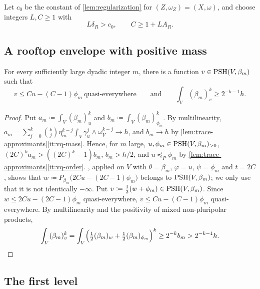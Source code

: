 \documentclass[11pt,a4paper]{amsart}
\newcommand{\lessP}{\preceq_{P}}
\theoremstyle{definition}
\begin{document}
Let $c_0$ be the constant of \cref{lem:regularization} for
$(Z,\omega_Z)=(X,\omega)$, and choose integers $L,C\ge1$ with
\begin{equation}\label{eq:constants}
  L\delta_R>c_0,\qquad C\ge 1+LA_R .
\end{equation}

\subsection{A rooftop envelope with positive mass}

\begin{lemma}\label{lem:positive-rooftop}
For every sufficiently large dyadic integer $m$, there is a function
$v\in\mathrm{PSH}(V,\beta_m)$ such that
\[
  v\le Cu-(C-1)\phi_m\ \text{quasi-everywhere}
  \qquad\text{and}\qquad
  \int_V(\beta_m)_{v}^k\ge2^{-k-1}h .
\]
\end{lemma}

\begin{proof}
Put $a_m\coloneqq \int_V(\beta_m)_u^k$ and
$b_m\coloneqq \int_V(\beta_m)_{\phi_m}^k$. By multilinearity,
$a_m=\sum_{j=0}^k\binom kj\eta_m^{k-j}\int_V\gamma_u^j\wedge\omega_V^{k-j}\to h$,
and $b_m\to h$ by \cref{lem:trace-approximants}\ref{it:vq-mass}. Hence,
for $m$ large, $u,\phi_m\in\mathrm{PSH}(V,\beta_m)_{>0}$,
$(2C)^ka_m>((2C)^k-1)b_m$, $b_m>h/2$, and $u\lessP\phi_m$ by
\cref{lem:trace-approximants}\ref{it:vq-order}. ,
applied on $V$ with $\theta=\beta_m$, $\varphi=u$, $\psi=\phi_m$ and
$t=2C$, shows that
$w\coloneqq P_{\beta_m}\bigl(2Cu-(2C-1)\phi_m\bigr)$ belongs to
$\mathrm{PSH}(V,\beta_m)$; we only use that it is not identically $-\infty$. Put
$v\coloneqq \tfrac12(w+\phi_m)\in\mathrm{PSH}(V,\beta_m)$. Since
$w\le 2Cu-(2C-1)\phi_m$ quasi-everywhere, $v\le Cu-(C-1)\phi_m$
quasi-everywhere. By multilinearity and the positivity of mixed
non-pluripolar products,
\[
  \int_V(\beta_m)_{v}^k
  =\int_V\Bigl(\tfrac12(\beta_m)_{w}+\tfrac12(\beta_m)_{\phi_m}\Bigr)^k
  \ge2^{-k}b_m>2^{-k-1}h. \qedhere
\]
\end{proof}

\subsection{The first level}\label{sec:first-level}
\end{document}
